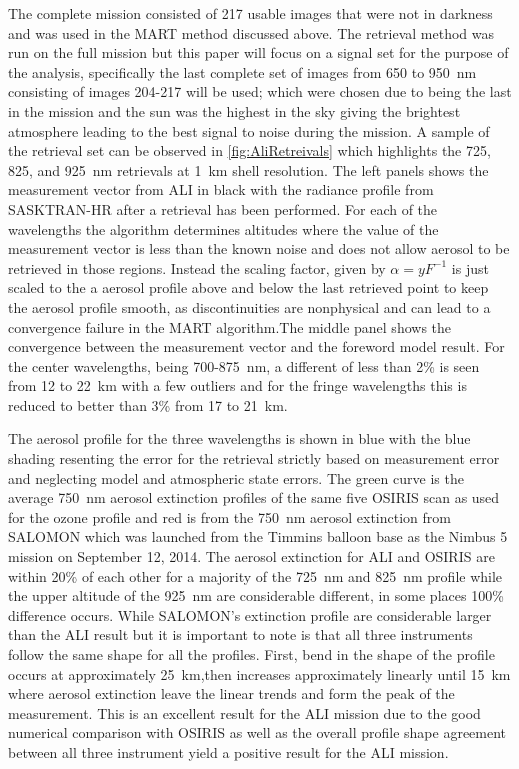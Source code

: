\documentclass[12pt]{article}
\begin{document}
The complete mission consisted of 217 usable images that were not in darkness and was used in the MART method discussed above. The retrieval method was run on the full mission but this paper will focus on a signal set for the purpose of the analysis, specifically the last complete set of images from 650 to 950~nm consisting of images 204-217 will be used; which were chosen due to being the last in the mission and the sun was the highest in the sky giving the brightest atmosphere leading to the best signal to noise during the mission. A sample of the retrieval set can be observed in \autoref{fig:AliRetreivals} which highlights the 725, 825, and 925~nm retrievals at 1~km shell resolution. The left panels shows the measurement vector from ALI in black with the radiance profile from SASKTRAN-HR after a retrieval has been performed. For each of the wavelengths the algorithm determines altitudes where the value of the measurement vector is less than the known noise and does not allow aerosol to be retrieved in those regions. Instead the scaling factor, given by $\alpha = yF^{-1}$ is just scaled to the a aerosol profile above and below the last retrieved point to keep the aerosol profile smooth, as discontinuities are nonphysical and can lead to a convergence failure in the MART algorithm.The middle panel shows the convergence between the measurement vector and the foreword model result. For the center wavelengths, being 700-875~nm, a different of less than 2\% is seen from 12 to 22~km with a few outliers and for the fringe wavelengths this is reduced to better than 3\% from 17 to 21~km.

The aerosol profile for the three wavelengths is shown in blue with the blue shading resenting the error for the retrieval strictly based on measurement error and neglecting model and atmospheric state errors. The green curve is the average 750~nm aerosol extinction profiles of the same five OSIRIS scan as used for the ozone profile and red is from the 750~nm aerosol extinction from SALOMON \citep{Berthet2002} which was launched from the Timmins balloon base as the Nimbus 5 mission on September 12, 2014. The aerosol extinction for ALI and OSIRIS are within 20\% of each other for a majority of the 725~nm and 825~nm profile while the upper altitude of the 925~nm are considerable different, in some places 100\% difference occurs. While SALOMON's extinction profile are considerable larger than the ALI result but it is important to note is that all three instruments follow the same shape for all the profiles. First, bend in the shape of the profile occurs at approximately 25~km,then increases approximately linearly until 15~km where aerosol extinction leave the linear trends and form the peak of the measurement. This is an excellent result for the ALI mission due to the good numerical comparison with OSIRIS as well as the overall profile shape agreement between all three instrument yield a positive result for the ALI mission. 
\end{document}
